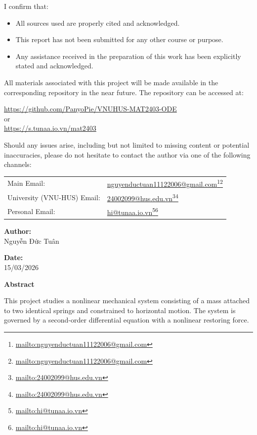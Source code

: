 \documentclass[12pt, a4paper]{report}
\let\oldhref\href
\renewcommand{\href}[2]{\oldhref{#1}{#2}\footnote{\url{#1}}}
\begin{document}
	I confirm that:
	\begin{itemize}
		\item All sources used are properly cited and acknowledged.
		\item This report has not been submitted for any other course or purpose.
		\item Any assistance received in the preparation of this work has been explicitly stated and acknowledged.
	\end{itemize}
	
	All materials associated with this project will be made available in the corresponding repository in the near future. The repository can be accessed at:
	\begin{center}
		\url{https://github.com/PanyoPie/VNUHUS-MAT2403-ODE} \\
		or \\
		\url{https://s.tunaa.io.vn/mat2403}
	\end{center}
	
	Should any issues arise, including but not limited to missing content or potential inaccuracies, please do not hesitate to contact the author via one of the following channels:

	\begin{tabular}{ll}
		Main Email:    & \href{mailto:nguyenductuan11122006@gmail.com}{nguyenductuan11122006@gmail.com} \\
		University (VNU-HUS) Email:  & \href{mailto:24002099@hus.edu.vn}{24002099@hus.edu.vn} \\
		Personal Email:& \href{mailto:hi@tunaa.io.vn}{hi@tunaa.io.vn} \\
	\end{tabular}
	
	
	\begin{flushright}
		\noindent
		\textbf{Author:} \\
		Nguyễn Đức Tuân
		
		\vspace{0.2cm}
		
		\noindent
		\textbf{Date:} \\
		15/03/2026
	\end{flushright}
	
	\newpage
	\begin{center}
		{\Huge \textbf{Abstract}}
		\vspace{1cm}
	\end{center}
	This project studies a nonlinear mechanical system consisting of a mass attached to two identical springs and constrained to horizontal motion. The system is governed by a second-order differential equation with a nonlinear restoring force.
	
\end{document}
